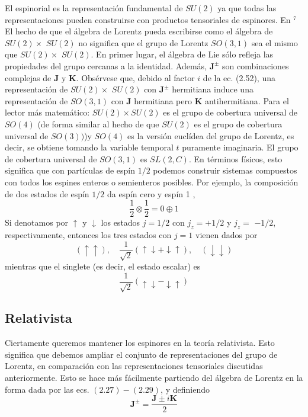 El espinorial es la representación fundamental de $S U(2)$ ya que todas las representaciones pueden construirse con productos tensoriales de espinores. En ${ }^{7}$ El hecho de que el álgebra de Lorentz pueda escribirse como el álgebra de $S U(2) \times$ $S U(2)$ no significa que el grupo de Lorentz $S O(3,1)$ sea el mismo que $S U(2) \times$ $S U(2)$. En primer lugar, el álgebra de Lie sólo refleja las propiedades del grupo cercanas a la identidad. Además, $\mathbf{J}^{ \pm}$ son combinaciones complejas de $\mathbf{J}$ y $\mathbf{K}$. Obsérvese que, debido al factor $i$ de la ec. (2.52), una representación de $S U(2) \times$ $S U(2)$ con $\mathbf{J}^{ \pm}$ hermitiana induce una representación de $S O(3,1)$ con $\mathbf{J}$ hermitiana pero $\mathbf{K}$ antihermitiana. Para el lector más matemático: $S U(2) \times S U(2)$ es el grupo de cobertura universal de $S O(4)$ (de forma similar al hecho de que $S U(2)$ es el grupo de cobertura universal de $S O(3))$)y $S O(4)$ es la versión euclídea del grupo de Lorentz, es decir, se obtiene tomando la variable temporal $t$ puramente imaginaria. El grupo de cobertura universal de $S O(3,1)$ es $S L(2, C)$. En términos físicos, esto significa que con partículas de espín $1 / 2$ podemos construir sistemas compuestos con todos los espines enteros o semienteros posibles. Por ejemplo, la composición de dos estados de espín $1 / 2$ da espín cero y espín 1 ,
\begin{equation*}
  \frac{1}{2} \otimes \frac{1}{2}=0 \oplus 1 \tag{2.49}
  \end{equation*}
  Si denotamos por $\uparrow$ y $\downarrow$ los estados $j=1 / 2$ con $j_{z}=+1 / 2$ y $j_{z}=$ $-1 / 2$, respectivamente, entonces los tres estados con $j=1$ vienen dados por
  \begin{equation*}
    (\uparrow \uparrow), \quad \frac{1}{\sqrt{2}}(\uparrow \downarrow+\downarrow \uparrow), \quad(\downarrow \downarrow) \tag{2.50}
    \end{equation*}
    mientras que el singlete (es decir, el estado escalar) es
    \begin{equation*}
      \frac{1}{\sqrt{2}}(\uparrow \downarrow-\downarrow \uparrow) \tag{2.51}
      \end{equation*}
                      \subsection{Relativista}
                      Ciertamente queremos mantener los espinores en la teoría relativista. Esto significa que debemos ampliar el conjunto de representaciones del grupo de Lorentz, en comparación con las representaciones tensoriales discutidas anteriormente. Esto se hace más fácilmente partiendo del álgebra de Lorentz en la forma dada por las ecs. $(2.27)-(2.29)$, y definiendo
                      \begin{equation*}
                        \mathbf{J}^{ \pm}=\frac{\mathbf{J} \pm i \mathbf{K}}{2} \tag{2.52}
                        \end{equation*}

